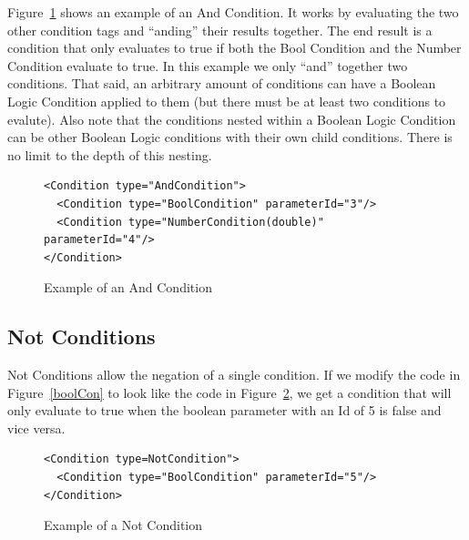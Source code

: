 Figure~\ref{andCon} shows an example of an And Condition. It works by evaluating the two other condition tags and ``anding'' their results together. 
The end result is a condition that only evaluates to true if both the Bool Condition and the Number Condition evaluate to true. In this 
example we only ``and'' together two conditions. That said, an arbitrary amount of conditions can have a Boolean Logic Condition applied 
to them (but there must be at least two conditions to evalute). Also note that the conditions nested within a Boolean Logic Condition
can be other Boolean Logic conditions with their own child conditions. There is no limit to the depth of this nesting.
\begin{figure}
\centering
{\footnotesize
\begin{Verbatim}
<Condition type="AndCondition">
  <Condition type="BoolCondition" parameterId="3"/>
  <Condition type="NumberCondition(double)" parameterId="4"/>
</Condition>
\end{Verbatim}
}
\caption{Example of an And Condition}
\label{andCon}
\end{figure}

\subsection{Not Conditions}
Not Conditions allow the negation of a single condition. If we modify the code in Figure~\ref{boolCon} to look like the code in 
Figure~\ref{notCon}, we get a condition that will only evaluate to true when the boolean parameter with an Id of 5 is false and 
vice versa. 
\begin{figure}
\centering
{\footnotesize
\begin{Verbatim}
<Condition type=NotCondition">
  <Condition type="BoolCondition" parameterId="5"/>
</Condition>
\end{Verbatim}
}
\caption{Example of a Not Condition}
\label{notCon}
\end{figure}

